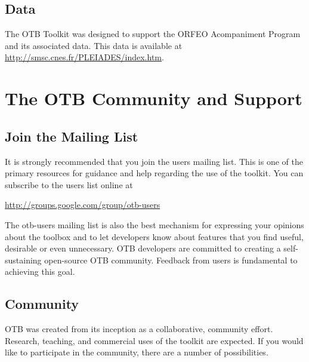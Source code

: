 \subsection{Data}
\label{sec:Data}

The OTB Toolkit was designed to support the ORFEO Acompaniment Program
and its associated data. This data is available at
\url{http://smsc.cnes.fr/PLEIADES/index.htm}.



\section{The OTB Community and Support}
\label{sec:AdditionalResources}

\subsection{Join the Mailing List}
\label{sec:JoinMailList}


It is strongly recommended that you join the users mailing list. This is one
of the primary resources for guidance and help regarding the use of the
toolkit. You can subscribe to the users list online at

\begin{center}
\url{http://groups.google.com/group/otb-users}
\end{center}

The otb-users mailing list is also the best mechanism for expressing your
opinions about the toolbox and to let developers know about features that you
find useful, desirable or even unnecessary. OTB developers are committed to
creating a self-sustaining open-source OTB community. Feedback from users is
fundamental to achieving this goal.

\subsection{Community}
OTB was created from its inception as a collaborative, community
effort. Research, teaching, and commercial uses of the toolkit are
expected. If you would like to participate in the community, there are a
number of possibilities.

